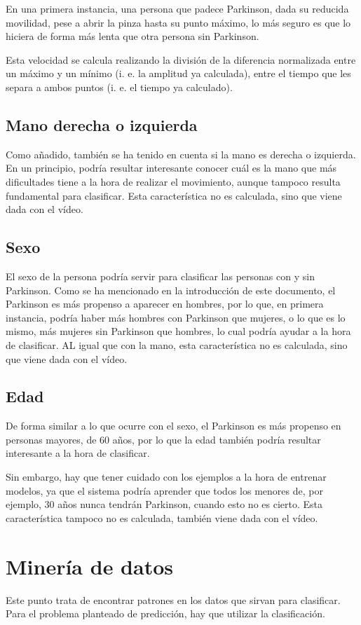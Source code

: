 En una primera instancia, una persona que padece Parkinson, dada su reducida movilidad, pese a abrir la pinza hasta su punto máximo, lo más seguro es que lo hiciera de forma más lenta que otra persona sin Parkinson.

Esta velocidad se calcula realizando la división de la diferencia normalizada entre un máximo y un mínimo (i. e. la amplitud ya calculada), entre el tiempo que les separa a ambos puntos (i. e. el tiempo ya calculado).

\subsection{Mano derecha o izquierda}
Como añadido, también se ha tenido en cuenta si la mano es derecha o izquierda. En un principio, podría resultar interesante conocer cuál es la mano que más dificultades tiene a la hora de realizar el movimiento, aunque tampoco resulta fundamental para clasificar. Esta característica no es calculada, sino que viene dada con el vídeo.

\subsection{Sexo}
El sexo de la persona podría servir para clasificar las personas con y sin Parkinson. Como se ha mencionado en la introducción de este documento, el Parkinson es más propenso a aparecer en hombres, por lo que, en primera instancia, podría haber más hombres con Parkinson que mujeres, o lo que es lo mismo, más mujeres sin Parkinson que hombres, lo cual podría ayudar a la hora de clasificar. AL igual que con la mano, esta característica no es calculada, sino que viene dada con el vídeo.

\subsection{Edad}
De forma similar a lo que ocurre con el sexo, el Parkinson es más propenso en personas mayores, de 60 años, por lo que la edad también podría resultar interesante a la hora de clasificar.

Sin embargo, hay que tener cuidado con los ejemplos a la hora de entrenar modelos, ya que el sistema podría aprender que todos los menores de, por ejemplo, 30 años nunca tendrán Parkinson, cuando esto no es cierto. Esta característica tampoco no es calculada, también viene dada con el vídeo.

\section{Minería de datos}
Este punto trata de encontrar patrones en los datos que sirvan para clasificar. Para el problema planteado de predicción, hay que utilizar la clasificación.


